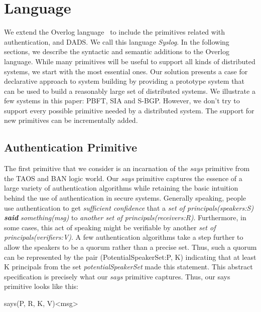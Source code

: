 \section{Language}

We extend the Overlog language~\cite{p2sosp} to include the primitives related with authentication, and DADS. We call this language {\em Syslog}. In the following sections, we describe the syntactic and semantic additions to the Overlog language. While many primitives will be useful to support all kinds of distributed systems, we start with the most essential ones. Our solution presents a case for declarative approach to system building by providing a prototype system that can be used to build a reasonably large set of distributed systems. We illustrate a few systems in this paper: PBFT, SIA and S-BGP. However, we don't try to support every possible primitive needed by a distributed system. The support for new primitives can be incrementally added.

\subsection{Authentication Primitive}

The first primitive that we consider is an incarnation of the {\em says} primitive from the TAOS and BAN logic world. Our {\em says} primitive captures the essence of a large variety of authentication algorithms while retaining the basic intuition behind the use of authentication in secure systems. Generally speaking, people use authentication to get {\em sufficient confidence} that a {\em set of principals(speakers:S)} {\bf{\em said}} {\em something(msg)} to {\em another set of principals(receivers:R)}. Furthermore, in some cases, this act of speaking might be verifiable by another {\em set of principals(verifiers:V)}. A few authentication algorithms take a step further to allow the speakers to be a quorum rather than a precise set. Thus, such a quorum can be represented by the pair (PotentialSpeakerSet:P, K) indicating that at least K principals from the set {\em potentialSpeakerSet} made this statement. This abstract specification is precisely what our {\em says} primitive captures. Thus, our says primitive looks like this:
\begin{center}
says(P, R, K, V)<msg>
\end{center}

